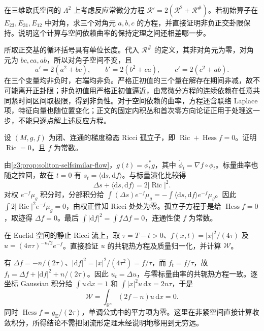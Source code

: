 \begin{exercise}\label{g3:ex:ricci-three-eigenvalues}
在三维欧氏空间的 \(\Lambda^2\) 上考虑反应常微分方程 \(\mathcal R'=2(\mathcal R^2+\mathcal R^\#)\)。若初始算子在 \(E_{23},E_{31},E_{12}\) 中对角，求三个对角元 \(a,b,c\) 的方程，并直接证明非负正交卦限保持。说明这个计算与空间依赖曲率的保持定理之间还相差哪一步。
\end{exercise}
\begin{solution}
所取正交基的循环括号具有单位长度。代入 \(\mathcal R^\#\) 的定义，其非对角元为零，对角元为 \(bc,ca,ab\)，所以对角子空间不变，且
\[
a'=2(a^2+bc),\qquad b'=2(b^2+ca),\qquad c'=2(c^2+ab).
\]
在三个变量均非负时，右端均非负。严格正初值的三个量在解存在期间非减，故不可能离开正卦限；非负初值用严格正初值逼近，由常微分方程的连续依赖在任意共同紧时间区间取极限，得到非负性。对于空间依赖的曲率，方程还含联络 Laplace 项，特征向量也随位置变化；正文的固定内积丛和首次零方向论证正用于处理这一步，不能只逐点解上述反应方程。
\end{solution}

\begin{exercise}\label{g3:ex:ricci-compact-steady}
设 \((M,g,f)\) 为闭、连通的梯度稳态 Ricci 孤立子，即 \(\operatorname{Ric}+\operatorname{Hess}f=0\)。证明 \(\operatorname{Ric}=0\)，且 \(f\) 为常数。
\end{exercise}
\begin{solution}
由\cref{g3:prop:soliton-selfsimilar-flow}，\(g(t)=\phi_t^*g\)，其中 \(\dot\phi_t=\nabla f\circ\phi_t\)。标量曲率也随之拉回，故在 \(t=0\) 有 \(s_t=\langle\mathrm ds,\mathrm df\rangle\)。与标量演化比较得
\[
\Delta s+\langle\mathrm ds,\mathrm df\rangle=2|\operatorname{Ric}|^2.
\]
对权 \(e^{-f}\mu_g\) 积分时，分部积分给
\(\int(\Delta s)e^{-f}\mu_g=-\int\langle\mathrm ds,\mathrm df\rangle e^{-f}\mu_g\)。因此 \(\int2|\operatorname{Ric}|^2e^{-f}\mu_g=0\)，由权正性知 Ricci 处处为零。孤立子方程于是给 \(\operatorname{Hess}f=0\)，取迹得 \(\Delta f=0\)。最后 \(\int|\mathrm df|^2=\int f\Delta f=0\)，连通性使 \(f\) 为常数。
\end{solution}

\begin{exercise}\label{g3:ex:ricci-gaussian-entropy}
在 Euclid 空间的静止 Ricci 流上，取 \(\tau=T-t>0\)、\(f(x,t)=|x|^2/(4\tau)\) 及 \(u=(4\pi\tau)^{-n/2}e^{-f}\)。直接验证 \(u\) 的共轭热方程及质量归一化，并计算 \(\mathcal W\)。
\end{exercise}
\begin{solution}
有 \(\Delta f=-n/(2\tau)\)、\(|\mathrm df|^2=|x|^2/(4\tau^2)=f/\tau\)，而 \(f_t=f/\tau\)，故 \(f_t=\Delta f+|\mathrm df|^2+n/(2\tau)\)。因此 \(u_t=\Delta u\)，与零标量曲率的共轭热方程一致。逐坐标 Gaussian 积分给 \(\int u\,\mathrm dx=1\) 和 \(\int|x|^2u\,\mathrm dx=2n\tau\)，于是
\[
\mathcal W=\int_{\mathbb R^n}(2f-n)u\,\mathrm dx=0.
\]
同时 \(\operatorname{Hess}f=g_{\mathrm E}/(2\tau)\)，单调公式中的平方项为零。这里在非紧空间直接计算收敛积分，所得结论不需把闭流形定理未经说明地移用到无穷远。
\end{solution}

